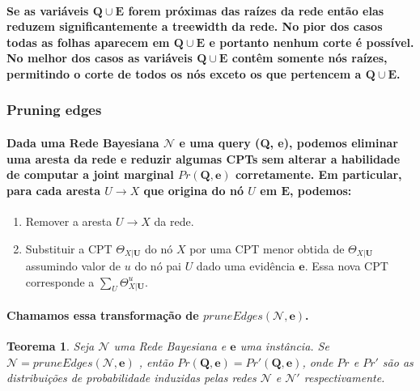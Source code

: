 \documentclass[a4paper,10pt]{article}
\theoremstyle{plain}
\newtheorem*{spn-thm}{Teorema}
\begin{document}
\paragraph{
  Se as variáveis $\mathbf{Q} \cup \mathbf{E}$ forem próximas das raízes da rede então elas reduzem
  significantemente a treewidth da rede. No pior dos casos todas as folhas aparecem em $\mathbf{Q}
  \cup \mathbf{E}$ e portanto nenhum corte é possível. No melhor dos casos as variáveis $\mathbf{Q}
  \cup \mathbf{E}$ contêm somente nós raízes, permitindo o corte de todos os nós exceto os que
  pertencem a $\mathbf{Q} \cup \mathbf{E}$.
}

\subsubsection{Pruning edges}

\paragraph{
  Dada uma Rede Bayesiana $\mathcal{N}$ e uma query (\textbf{Q}, \textbf{e}), podemos eliminar
  uma aresta da rede e reduzir algumas CPTs sem alterar a habilidade de computar a joint marginal
  $Pr(\mathbf{Q}, \mathbf{e})$ corretamente. Em particular, para cada aresta $U \to X$ que origina
  do nó $U$ em $\mathbf{E}$, podemos:
}

\begin{enumerate}
  \item Remover a aresta $U \to X$ da rede.
  \item Substituir a CPT $\Theta_{X|\mathbf{U}}$ do nó $X$ por uma CPT menor obtida de
    $\Theta_{X|\mathbf{U}}$ assumindo valor de $u$ do nó pai $U$ dado uma evidência $\mathbf{e}$.
    Essa nova CPT corresponde a $\sum_U \Theta_{X|\mathbf{U}}^u$.
\end{enumerate}

\paragraph{
  Chamamos essa transformação de $pruneEdges(\mathcal{N}, \mathbf{e})$.
}

\begin{spn-thm} Seja $\mathcal{N}$ uma Rede Bayesiana e $\mathbf{e}$ uma instância. Se $\mathcal{N}
  = pruneEdges(\mathcal{N}, \mathbf{e})$ , então $Pr(\mathbf{Q}, \mathbf{e}) = Pr'(\mathbf{Q},
  \mathbf{e})$, onde $Pr$ e $Pr'$ são as distribuições de probabilidade induzidas pelas redes
  $\mathcal{N}$ e $\mathcal{N}'$ respectivamente.
\end{spn-thm}
\end{document}
